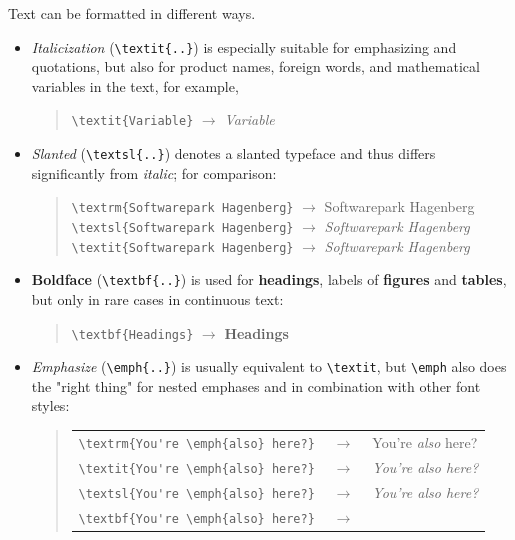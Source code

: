 Text can be formatted in different ways.
%
\begin{itemize}
    \item \textit{Italicization} (\verb!\textit{..}!) is especially suitable for
    emphasizing and quotations, but also for product names, foreign words, and
    mathematical variables in the text, for example,
    \begin{quote}
        \verb!\textit{Variable}! $\rightarrow$ \textit{Variable}
    \end{quote}
%
    \item \textsl{Slanted} (\verb!\textsl{..}!) denotes a slanted typeface and
    thus differs significantly from \textit{italic}; for comparison:
    \begin{quote}
        \verb!\textrm{Softwarepark Hagenberg}! $\rightarrow$
        \textrm{Softwarepark Hagenberg} \newline%
        \verb!\textsl{Softwarepark Hagenberg}! $\rightarrow$
        \textsl{Softwarepark Hagenberg} \newline%
        \verb!\textit{Softwarepark Hagenberg}! $\rightarrow$ \textit{Softwarepark Hagenberg}
    \end{quote}
%
    \item \textbf{Boldface} (\verb!\textbf{..}!) is used for \textbf{headings},
    labels of \textbf{figures} and \textbf{tables}, but only in rare cases in
    continuous text:
    \begin{quote}
        \verb!\textbf{Headings}! $\rightarrow$ \textbf{Headings}
    \end{quote}
%
    \item \emph{Emphasize} (\verb!\emph{..}!) is usually equivalent to
    \verb!\textit!, but \verb!\emph! also does the "right thing" for nested
    emphases and in combination with other font styles:
    \begin{quote}
        \setlength{\tabcolsep}{0pt}%
        \begin{tabular}{lcl}
            \verb!\textrm{You're \emph{also} here?}! & $\;\rightarrow\;$ &
            \textrm{You're \emph{also} here?} \\
            \verb!\textit{You're \emph{also} here?}! & $\;\rightarrow\;$ &
            \textit{You're \emph{also} here?} \\
            \verb!\textsl{You're \emph{also} here?}! & $\;\rightarrow\;$ &
            \textsl{You're \emph{also} here?} \\
            \verb!\textbf{You're \emph{also} here?}! & $\;\rightarrow\;$ &

\end{tabular}
\end{quote}
\end{itemize}
